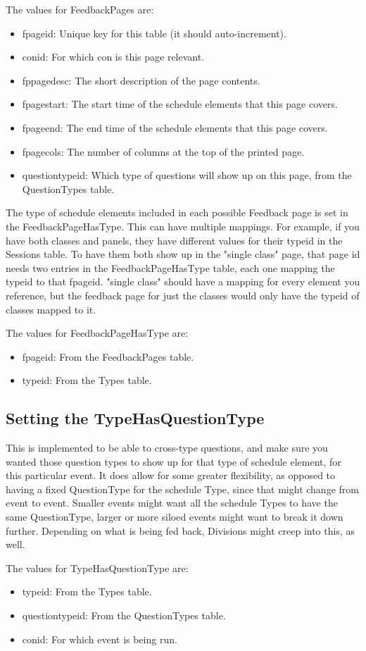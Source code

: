 \documentclass[captions=tablesignature]{scrartcl}
\begin{document}
The values for FeedbackPages are:
\begin{itemize}
\item fpageid: Unique key for this table (it should auto-increment).
\item conid: For which con is this page relevant.
\item fppagedesc: The short description of the page contents.
\item fpagestart: The start time of the schedule elements that this
page covers.
\item fpageend: The end time of the schedule elements that this page
covers.
\item fpagecols: The number of columns at the top of the printed page.
\item questiontypeid: Which type of questions will show up on this
page, from the QuestionTypes table.
\end{itemize}

The type of schedule elements included in each possible Feedback
page is set in the FeedbackPageHasType.  This can have multiple
mappings.  For example, if you have both classes and panels, they
have different values for their typeid in the Sessions table.  To
have them both show up in the "single class" page, that page id
needs two entries in the FeedbackPageHasType table, each one
mapping the typeid to that fpageid.  "single class" should have a
mapping for every element you reference, but the feedback page for
just the classes would only have the typeid of classes mapped to
it.

The values for FeedbackPageHasType are:
\begin{itemize}
\item fpageid: From the FeedbackPages table.
\item typeid: From the Types table.
\end{itemize}

\subsection{Setting the TypeHasQuestionType}
\label{sec-15-3}
This is implemented to be able to cross-type questions, and make
sure you wanted those question types to show up for that type of
schedule element, for this particular event.  It does allow for
some greater flexibility, as opposed to having a fixed QuestionType
for the schedule Type, since that might change from event to event.
Smaller events might want all the schedule Types to have the same
QuestionType, larger or more siloed events might want to break it
down further.  Depending on what is being fed back, Divisions might
creep into this, as well.

The values for TypeHasQuestionType are:
\begin{itemize}
\item typeid: From the Types table.
\item questiontypeid: From the QuestionTypes table.
\item conid: For which event is being run.
\end{itemize}
\end{document}
